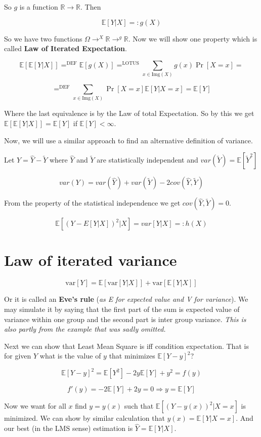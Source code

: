 So $g$ is a function $\mathbb{R} \to \mathbb{R}$. Then

$$
\mathbb{E} [Y \vert X] =: g(X)
$$

So we have two functions $\Omega \to^{X} \mathbb{R} \to^{g} \mathbb{R}$. Now we will show one property which is called \textbf{Law of Iterated Expectation}.

$$
\mathbb{E}[\mathbb{E}[Y \vert X]] =^{\text{DEF}} \mathbb{E}[g(X)] =^{\text{LOTUS}} \sum_{x \in \text{Img}(X)}g(x) \Pr[X = x] =
$$

$$
=^{\text{DEF}} \sum_{x \in \text{Img}(X)}\Pr[X=x] \mathbb{E} [Y \vert X =x] = \mathbb{E}[Y]
$$

Where the last equivalence is by the Law of total Expectation. So by this we get $\mathbb{E}[\mathbb{E}[Y \vert X]] = \mathbb{E}[Y]$ if $\mathbb{E}[Y] < \infty$.

Now, we will use a similar approach to find an alternative definition of variance.

Let $Y = \hat{Y} - \tilde{Y}$ where $\hat{Y}$ and $\tilde{Y}$ are statistically independent and $var(\tilde{Y}) = \mathbb{E}[\tilde{Y}^2]$

$$
var(Y) = var(\hat{Y}) + var(\tilde{Y}) - 2cov(\hat{Y}, \tilde{Y})
$$

From the property of the statistical independence we get $cov(\hat{Y}, \tilde{Y}) = 0$.

$$
\mathbb{E} [(Y - E[Y\vert X])^2 \vert X] = var[Y \vert X] =: h(X)
$$

\section{Law of iterated variance}

$$
\text{var} [Y] = \mathbb{E}[\text{var}[Y \vert X]] + \text{var}[\mathbb{E}[Y \vert X]]
$$

Or it is called an \textbf{Eve's rule} (\textit{as E for expected value and V for variance}). We may simulate it by saying that the first part of the sum is expected value of variance within one group and the second part is inter group variance. \textit{This is also partly from the example that was sadly omitted.}

Next we can show that Least Mean Square is iff condition expectation. That is for given $Y$ what is the value of $y$ that minimizes $\mathbb{E}[Y - y]^{2}$?

$$
\mathbb{E}[Y - y]^{2} = \mathbb{E}[Y^{2}] - 2y\mathbb{E}[Y] + y^{2} = f(y)
$$

$$
f'(y) = - 2 \mathbb{E}[Y] + 2y = 0 \Rightarrow y = \mathbb{E}[Y]
$$

Now we want for all $x$ find $y = y(x)$ such that $\mathbb{E}[(Y - y(x))^{2} \vert X = x]$ is minimized. We can show by similar calculation that $y(x) = \mathbb{E}[Y \vert X =x ]$. And our best (in the LMS sense) estimation is $\hat{Y} = \mathbb{E} [Y \vert X]$.
